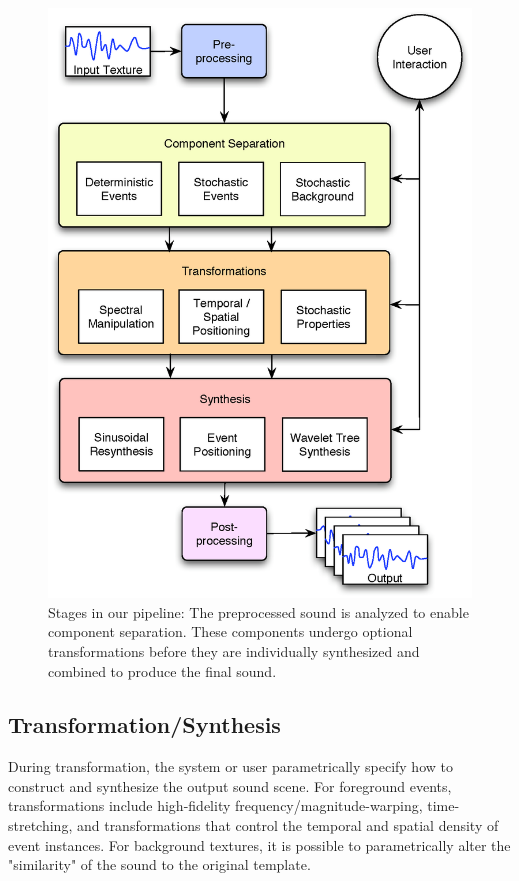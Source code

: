 \documentclass{acmsiggraph}               %
\begin{document}
\begin{figure}[h]
\centering
\includegraphics[width=.95\columnwidth]{ourpipeline.eps}
\caption{Stages in our pipeline: The preprocessed sound is analyzed to enable component separation. These components undergo optional transformations before they are individually synthesized and combined to produce the final sound.}
\end{figure}

\subsection{Transformation/Synthesis}
During transformation, the system or user parametrically specify how to 
construct and synthesize the output sound scene.  For foreground
events, transformations include high-fidelity frequency/magnitude-warping, 
time-stretching, and transformations that control the temporal and spatial 
density of event instances.  For background textures, it is possible to parametrically
alter the "similarity" of the sound to the original template.
\end{document}
